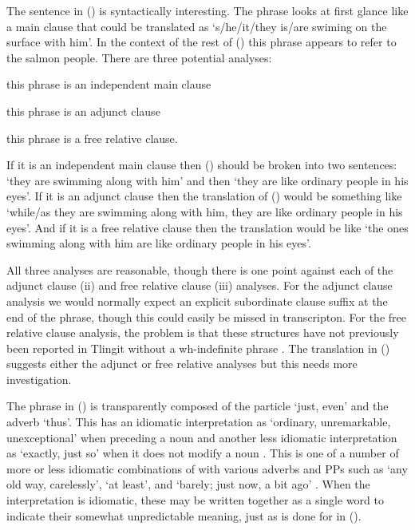 The sentence in (\lastx) is syntactically interesting.
The phrase  looks at first glance like a main clause that could be translated as ‘s/he/it/they is/are swiming on the surface with him’.
In the context of the rest of (\lastx) this phrase appears to refer to the salmon people.
There are three potential analyses: 
\begin{inlineenum}
\item	this phrase is an independent main clause
\item	this phrase is an adjunct clause
\item	this phrase is a free relative clause.
\end{inlineenum}
If it is an independent main clause then (\lastx) should be broken into two sentences: ‘they are swimming along with him’ and then ‘they are like ordinary people in his eyes’.
If it is an adjunct clause then the translation of (\lastx) would be something like ‘while/as they are swimming along with him, they are like ordinary people in his eyes’.
And if it is a free relative clause then the translation would be like ‘the ones swimming along with him are like ordinary people in his eyes’.

All three analyses are reasonable, though there is one point against each of the adjunct clause (ii) and free relative clause (iii) analyses.
For the adjunct clause analysis we would normally expect an explicit subordinate clause suffix  at the end of the phrase, though this could easily be missed in transcripton.
For the free relative clause analysis, the problem is that these structures have not previously been reported in Tlingit without a wh-indefinite phrase \parencite{cable:2005b}.
The translation in (\lastx) suggests either the adjunct or free relative analyses but this needs more investigation.

The phrase  in (\lastx) is transparently composed of the particle  ‘just, even’ and the adverb  ‘thus’.
This has an idiomatic interpretation as ‘ordinary, unremarkable, unexceptional’ when preceding a noun and another less idiomatic interpretation as ‘exactly, just so’ when it does not modify a noun \parencite[03/38]{leer:1973}.
This is one of a number of more or less idiomatic combinations of  with various adverbs and PPs such as  ‘any old way, carelessly’,  ‘at least’, and  ‘barely; just now, a bit ago’ \parencite[\textsc{t}·4–\textsc{t}·6]{leer:2001}.
When the interpretation is idiomatic, these may be written together as a single word to indicate their somewhat unpredictable meaning, just as is done for  in (\lastx).

